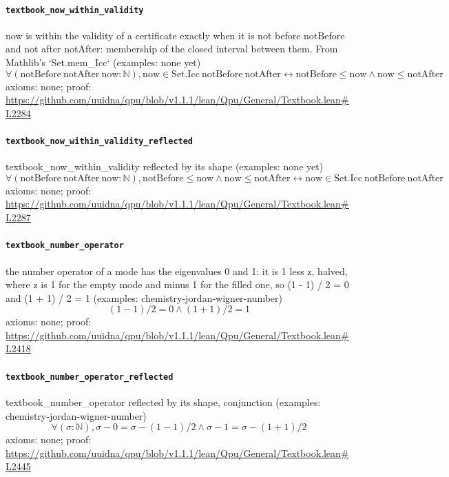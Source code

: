 \documentclass[11pt]{article}
\begin{document}
\paragraph{\texttt{textbook\_now\_within\_validity}}
now is within the validity of a certificate exactly when it is not before notBefore and not after notAfter: membership of the closed interval between them. From Mathlib's `Set.mem\_Icc` (examples: none yet)
\[ \forall (\mathrm{notBefore}\ \mathrm{notAfter}\ \mathrm{now} : \mathbb{N}), \mathrm{now} \in \mathrm{Set.Icc}\ \mathrm{notBefore}\ \mathrm{notAfter} \leftrightarrow \mathrm{notBefore} \le \mathrm{now} \land \mathrm{now} \le \mathrm{notAfter} \]
\noindent axioms: none; proof: \url{https://github.com/uuidna/qpu/blob/v1.1.1/lean/Qpu/General/Textbook.lean\#L2284}

\paragraph{\texttt{textbook\_now\_within\_validity\_reflected}}
textbook\_now\_within\_validity reflected by its shape (examples: none yet)
\[ \forall (\mathrm{notBefore}\ \mathrm{notAfter}\ \mathrm{now} : \mathbb{N}), \mathrm{notBefore} \le \mathrm{now} \land \mathrm{now} \le \mathrm{notAfter} \leftrightarrow \mathrm{now} \in \mathrm{Set.Icc}\ \mathrm{notBefore}\ \mathrm{notAfter} \]
\noindent axioms: none; proof: \url{https://github.com/uuidna/qpu/blob/v1.1.1/lean/Qpu/General/Textbook.lean\#L2287}

\paragraph{\texttt{textbook\_number\_operator}}
the number operator of a mode has the eigenvalues 0 and 1: it is 1 less z, halved, where z is 1 for the empty mode and minus 1 for the filled one, so (1 - 1) / 2 = 0 and (1 + 1) / 2 = 1 (examples: chemistry-jordan-wigner-number)
\[ (1 - 1) / 2 = 0 \land (1 + 1) / 2 = 1 \]
\noindent axioms: none; proof: \url{https://github.com/uuidna/qpu/blob/v1.1.1/lean/Qpu/General/Textbook.lean\#L2418}

\paragraph{\texttt{textbook\_number\_operator\_reflected}}
textbook\_number\_operator reflected by its shape, conjunction (examples: chemistry-jordan-wigner-number)
\[ \forall (\sigma : \mathbb{N}), \sigma - 0 = \sigma - (1 - 1) / 2 \land \sigma - 1 = \sigma - (1 + 1) / 2 \]
\noindent axioms: none; proof: \url{https://github.com/uuidna/qpu/blob/v1.1.1/lean/Qpu/General/Textbook.lean\#L2445}
\end{document}
